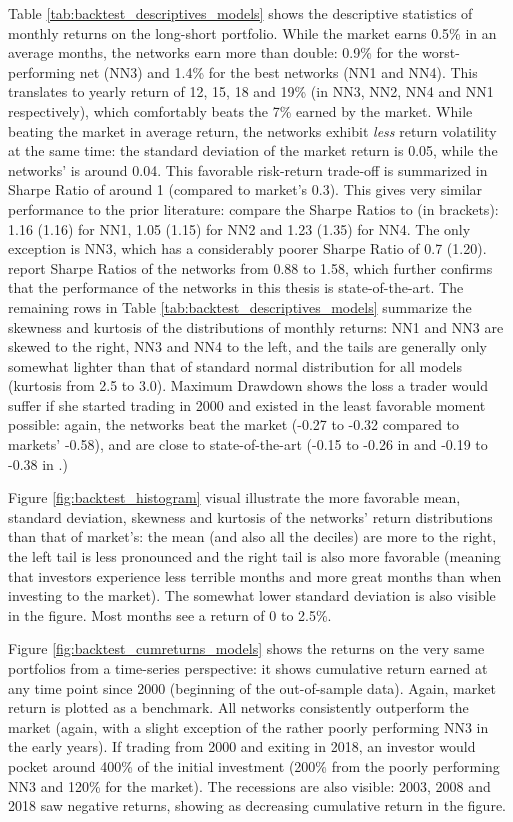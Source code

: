 		Table \ref{tab:backtest_descriptives_models} shows the descriptive statistics of monthly returns on the long-short portfolio. While the market earns 0.5\% in an average months, the networks earn more than double: 0.9\% for the worst-performing net (NN3) and 1.4\% for the best networks (NN1 and NN4). This translates to yearly return of 12, 15, 18 and 19\% (in NN3, NN2, NN4 and NN1 respectively), which comfortably beats the 7\% earned by the market. While beating the market in average return, the networks exhibit \textit{less} return volatility at the same time: the standard deviation of the market return is 0.05, while the networks' is around 0.04. This favorable risk-return trade-off is summarized in Sharpe Ratio of around 1 (compared to market's 0.3). This gives very similar performance to the prior literature: compare the Sharpe Ratios to \cite{gu2020empirical} (in brackets): 1.16 (1.16) for NN1, 1.05 (1.15) for NN2 and  1.23 (1.35) for NN4. The only exception is NN3, which has a considerably poorer Sharpe Ratio of 0.7 (1.20). \cite{tobek2020does} report Sharpe Ratios of the networks from 0.88 to 1.58, which further confirms that the performance of the networks in this thesis is state-of-the-art. The remaining rows in Table \ref{tab:backtest_descriptives_models} summarize the skewness and kurtosis of the distributions of monthly returns: NN1 and NN3 are skewed to the right, NN3 and NN4 to the left, and the tails are generally only somewhat lighter than that of standard normal distribution for all models (kurtosis from 2.5 to 3.0). Maximum Drawdown shows the loss a trader would suffer if she started trading in 2000 and existed in the least favorable moment possible: again, the networks beat the market (-0.27 to -0.32 compared to markets' -0.58), and are close to state-of-the-art (-0.15 to -0.26 in \cite{gu2020empirical} and -0.19 to -0.38 in \cite{tobek2020does}.)   
		
		Figure \ref{fig:backtest_histogram} visual illustrate the more favorable mean, standard deviation, skewness and kurtosis of the networks' return distributions than that of market's: the mean (and also all the deciles) are more to the right, the left tail is less pronounced and the right tail is also more favorable (meaning that investors experience less terrible months and more great months than when investing to the market). The somewhat lower standard deviation is also visible in the figure. Most months see a return of 0 to 2.5\%.       
		
		Figure \ref{fig:backtest_cumreturns_models} shows the returns on the very same portfolios from a time-series perspective: it shows cumulative return earned at any time point since 2000 (beginning of the out-of-sample data). Again, market return is plotted as a benchmark. All networks consistently outperform the market (again, with a slight exception of the rather poorly performing NN3 in the early years). If trading from 2000 and exiting in 2018, an investor would pocket around 400\% of the initial investment (200\% from the poorly performing NN3 and 120\% for the market). The recessions are also visible: 2003, 2008 and 2018 saw negative returns, showing as decreasing cumulative return in the figure.      
		 
